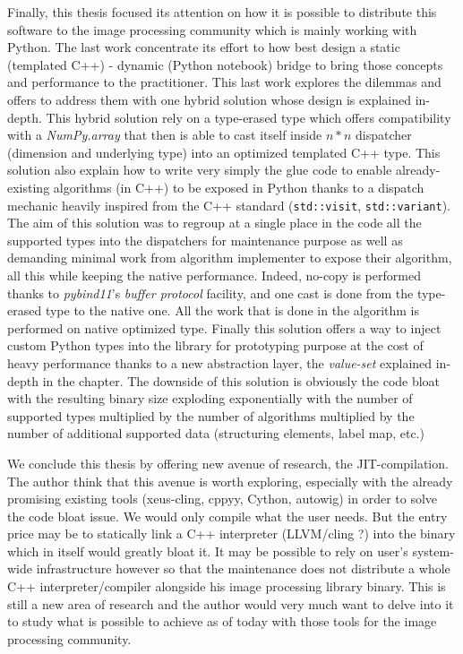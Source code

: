 Finally, this thesis focused its attention on how it is possible to distribute this software to the image processing
community which is mainly working with Python. The last work concentrate its effort to how best design a static
(templated C++) - dynamic (Python notebook) bridge to bring those concepts and performance to the practitioner. This
last work explores the dilemmas and offers to address them with one hybrid solution whose design is explained in-depth.
This hybrid solution rely on a type-erased type which offers compatibility with a \emph{NumPy.array} that then is able
to cast itself inside $n*n$ dispatcher (dimension and underlying type) into an optimized templated C++ type. This
solution also explain how to write very simply the glue code to enable already-existing algorithms (in C++) to be
exposed in Python thanks to a dispatch mechanic heavily inspired from the C++ standard (\texttt{std::visit},
\texttt{std::variant}). The aim of this solution was to regroup at a single place in the code all the supported types
into the dispatchers for maintenance purpose as well as demanding minimal work from algorithm implementer to expose
their algorithm, all this while keeping the native performance. Indeed, no-copy is performed thanks to
\emph{pybind11}'s \emph{buffer protocol} facility, and one cast is done from the type-erased type to the native one. All
the work that is done in the algorithm is performed on native optimized type. Finally this solution offers a way to
inject custom Python types into the library for prototyping purpose at the cost of heavy performance thanks to a new
abstraction layer, the \emph{value-set} explained in-depth in the chapter. The downside of this solution is obviously
the code bloat with the resulting binary size exploding exponentially with the number of supported types multiplied by
the number of algorithms multiplied by the number of additional supported data (structuring elements, label map, etc.)

We conclude this thesis by offering new avenue of research, the JIT-compilation. The author think that this avenue is
worth exploring, especially with the already promising existing tools (xeus-cling, cppyy, Cython, autowig) in order to
solve the code bloat issue. We would only compile what the user needs. But the entry price may be to statically link a
C++ interpreter (LLVM/cling ?) into the binary which in itself would greatly bloat it. It may be possible to rely on
user's system-wide infrastructure however so that the maintenance does not distribute a whole C++ interpreter/compiler
alongside his image processing library binary. This is still a new area of research and the author would very much want
to delve into it to study what is possible to achieve as of today with those tools for the image processing community.



